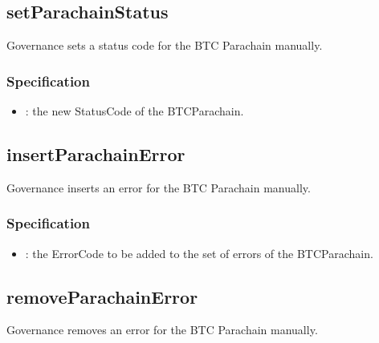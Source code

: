\documentclass[a4paper,10pt,english]{sphinxmanual}
\begin{document}
\subsection{setParachainStatus}
\label{\detokenize{spec/security:setparachainstatus}}\label{\detokenize{spec/security:id7}}
Governance sets a status code for the BTC Parachain manually.


\subsubsection{Specification}
\label{\detokenize{spec/security:id8}}


\begin{itemize}
\item {} 
: the new StatusCode of the BTC\sphinxhyphen{}Parachain.

\end{itemize}


\subsection{insertParachainError}
\label{\detokenize{spec/security:insertparachainerror}}\label{\detokenize{spec/security:id9}}
Governance inserts an error for the BTC Parachain manually.


\subsubsection{Specification}
\label{\detokenize{spec/security:id10}}


\begin{itemize}
\item {} 
: the ErrorCode to be added to the set of errors of the BTC\sphinxhyphen{}Parachain.

\end{itemize}


\subsection{removeParachainError}
\label{\detokenize{spec/security:removeparachainerror}}\label{\detokenize{spec/security:id11}}
Governance removes an error for the BTC Parachain manually.
\end{document}
